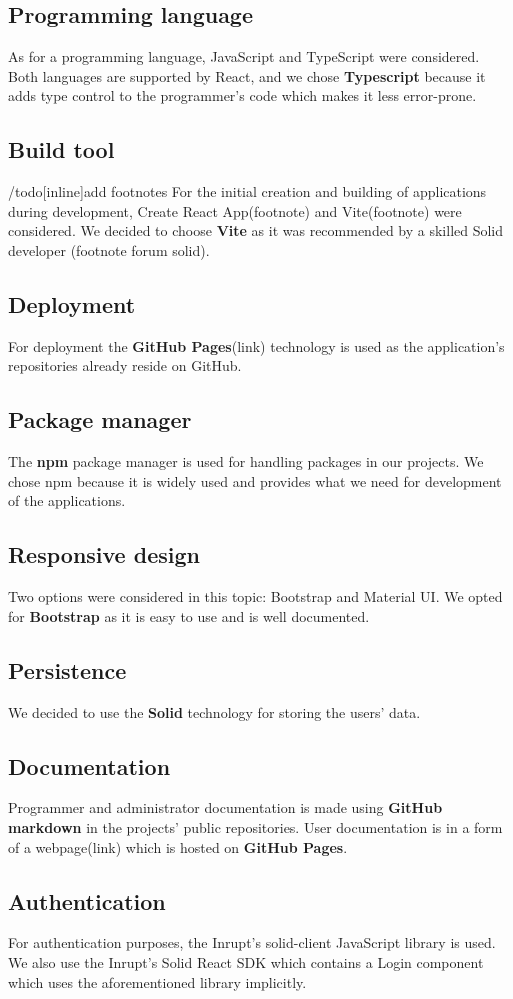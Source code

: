 \subsection*{Programming language}
As for a programming language, JavaScript and TypeScript were considered.
Both languages are supported by React, and we chose \textbf{Typescript} because it adds type control to the programmer's code which makes it less error-prone.

\subsection*{Build tool}
/todo[inline]{add footnotes}
For the initial creation and building of applications during development, Create React App(footnote) and Vite(footnote) were considered.
We decided to choose \textbf{Vite} as it was recommended by a skilled Solid developer (footnote forum solid). 


\subsection*{Deployment}
For deployment the \textbf{GitHub Pages}(link) technology is used as the application's repositories already reside on GitHub.


\subsection*{Package manager}
The \textbf{npm} package manager is used for handling packages in our projects.
We chose npm because it is widely used and provides what we need for development of the applications. 


\subsection*{Responsive design}
Two options were considered in this topic: Bootstrap and Material UI.
We opted for \textbf{Bootstrap} as it is easy to use and is well documented.


\subsection*{Persistence}
We decided to use the \textbf{Solid} technology for storing the users' data. 

\subsection*{Documentation}
Programmer and administrator documentation is made using \textbf{GitHub markdown} in the projects' public repositories.
User documentation is in a form of a webpage(link) which is hosted on \textbf{GitHub Pages}.

\subsection*{Authentication}
For authentication purposes, the Inrupt's solid-client JavaScript library is used.
We also use the Inrupt's Solid React SDK which contains a Login component which uses the aforementioned library implicitly.
